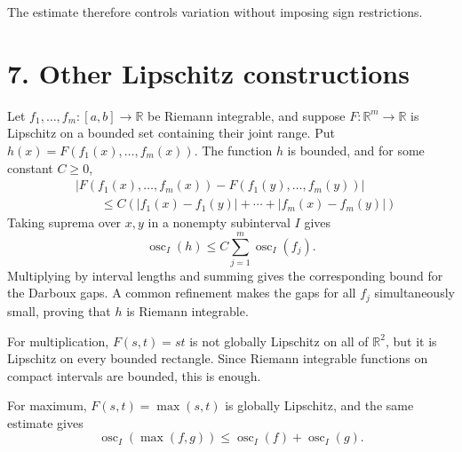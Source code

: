 \documentclass[11pt]{article}
\newcommand{\R}{\mathbb{R}}
\DeclareMathOperator{\osc}{osc}
\theoremstyle{plain}
\theoremstyle{remark}
\begin{document}
The estimate therefore controls variation without imposing sign restrictions.

\section*{7. Other Lipschitz constructions}

Let $f_1,\ldots,f_m:[a,b]\to\R$ be Riemann integrable, and suppose $F:\R^m\to\R$ is Lipschitz on a bounded set containing their joint range. Put $h(x)=F(f_1(x),\ldots,f_m(x))$. The function $h$ is bounded, and for some constant $C\geq0$,
\begin{align*}
&\left|F(f_1(x),\dots,f_m(x))-F(f_1(y),\dots,f_m(y))\right|\\
&\qquad\leq C\left(|f_1(x)-f_1(y)|+\cdots+|f_m(x)-f_m(y)|\right)
\end{align*}
Taking suprema over $x,y$ in a nonempty subinterval $I$ gives
\[
    \osc_I(h)\leq C\sum_{j=1}^m\osc_I(f_j).
\]
Multiplying by interval lengths and summing gives the corresponding bound for the Darboux gaps. A common refinement makes the gaps for all $f_j$ simultaneously small, proving that $h$ is Riemann integrable.

For multiplication, $F(s,t)=st$ is not globally Lipschitz on all of $\R^2$, but it is Lipschitz on every bounded rectangle. Since Riemann integrable functions on compact intervals are bounded, this is enough.

For maximum, $F(s,t)=\max(s,t)$ is globally Lipschitz, and the same estimate gives
\[
    \osc_I(\max(f,g))
    \leq
    \osc_I(f)+\osc_I(g).
\]
\end{document}
